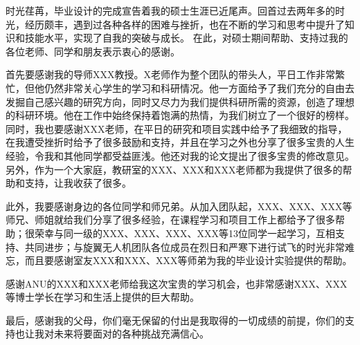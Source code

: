 
时光荏苒，毕业设计的完成宣告着我的硕士生涯已近尾声。回首过去两年多的时光，经历颇丰，遇到过各种各样的困难与挫折，也在不断的学习和思考中提升了知识和技能水平，实现了自我的突破与成长。
在此，对硕士期间帮助、支持过我的各位老师、同学和朋友表示衷心的感谢。

首先要感谢我的导师XXX教授。X老师作为整个团队的带头人，平日工作非常繁忙，但他仍然非常关心学生的学习和科研情况。他一方面给予了我们充分的自由去发掘自己感兴趣的研究方向，同时又尽力为我们提供科研所需的资源，创造了理想的科研环境。他在工作中始终保持着饱满的热情，为我们树立了一个很好的榜样。
同时，我也要感谢XXX老师，在平日的研究和项目实践中给予了我细致的指导，在我遭受挫折时给予了很多鼓励和支持，并且在学习之外也分享了很多宝贵的人生经验，令我和其他同学都受益匪浅。他还对我的论文提出了很多宝贵的修改意见。另外，作为一个大家庭，教研室的XXX、XXX和XXX老师都为我提供了很多的帮助和支持，让我收获了很多。

此外，我要感谢身边的各位同学和师兄弟。从加入团队起，XXX、XXX、XXX等师兄、师姐就给我们分享了很多经验，在课程学习和项目工作上都给予了很多帮助；很荣幸与同一级的XXX、XXX、XXX、XXX等13位同学一起学习，互相支持、共同进步；与旋翼无人机团队各位成员在烈日和严寒下进行试飞的时光非常难忘，而且要感谢室友XXX和XXX、XXX等师弟为我的毕业设计实验提供的帮助。

感谢ANU的XXX和XXX老师给我这次宝贵的学习机会，也非常感谢XXX、XXX等博士学长在学习和生活上提供的巨大帮助。

最后，感谢我的父母，你们毫无保留的付出是我取得的一切成绩的前提，你们的支持也让我对未来将要面对的各种挑战充满信心。